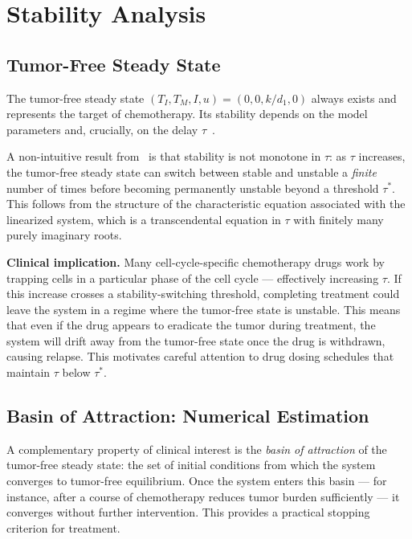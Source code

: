 \section{Stability Analysis}
\label{sec:analysis}

\subsection{Tumor-Free Steady State}

The tumor-free steady state $(T_I, T_M, I, u) = (0, 0, k/d_1, 0)$ always exists and represents the target of chemotherapy. Its stability depends on the model parameters and, crucially, on the delay $\tau$~\cite{villasana2003}.

A non-intuitive result from~\cite{villasana2003} is that stability is not monotone in $\tau$: as $\tau$ increases, the tumor-free steady state can switch between stable and unstable a \emph{finite} number of times before becoming permanently unstable beyond a threshold $\tau^*$. This follows from the structure of the characteristic equation associated with the linearized system, which is a transcendental equation in $\tau$ with finitely many purely imaginary roots.

\textbf{Clinical implication.} Many cell-cycle-specific chemotherapy drugs work by trapping cells in a particular phase of the cell cycle --- effectively increasing $\tau$. If this increase crosses a stability-switching threshold, completing treatment could leave the system in a regime where the tumor-free state is unstable. This means that even if the drug appears to eradicate the tumor during treatment, the system will drift away from the tumor-free state once the drug is withdrawn, causing relapse. This motivates careful attention to drug dosing schedules that maintain $\tau$ below $\tau^*$.

\subsection{Basin of Attraction: Numerical Estimation}

A complementary property of clinical interest is the \emph{basin of attraction} of the tumor-free steady state: the set of initial conditions from which the system converges to tumor-free equilibrium. Once the system enters this basin --- for instance, after a course of chemotherapy reduces tumor burden sufficiently --- it converges without further intervention. This provides a practical stopping criterion for treatment.

